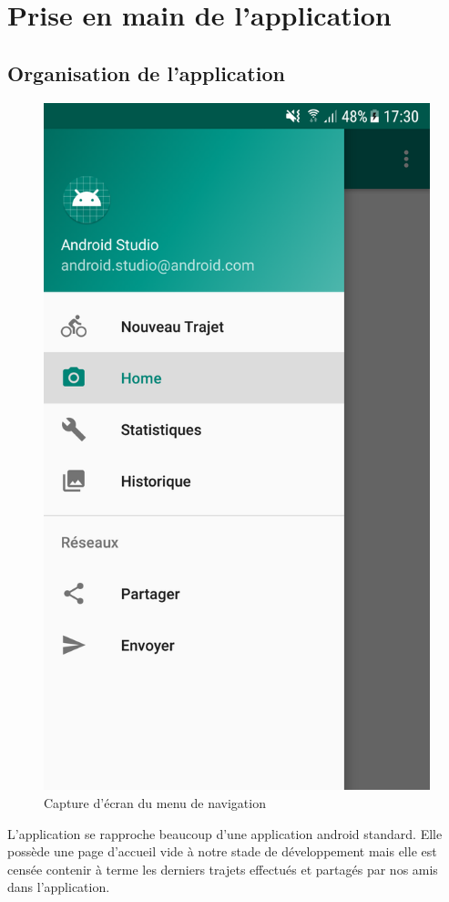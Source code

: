 \section{Prise en main de l'application}
\subsection{Organisation de l'application}
\begin{figure}
  \vspace{-10pt}
  \label{Menu de navigation}
  \centering
  \includegraphics[scale=0.13]{images/navigation-menu.png}
  \caption{Capture d'écran du menu de navigation}
\end{figure}
L'application se rapproche beaucoup d'une application android standard. Elle possède une page d'accueil vide à notre stade de développement mais
elle est censée contenir à terme les derniers trajets effectués et partagés par nos amis dans l'application.

